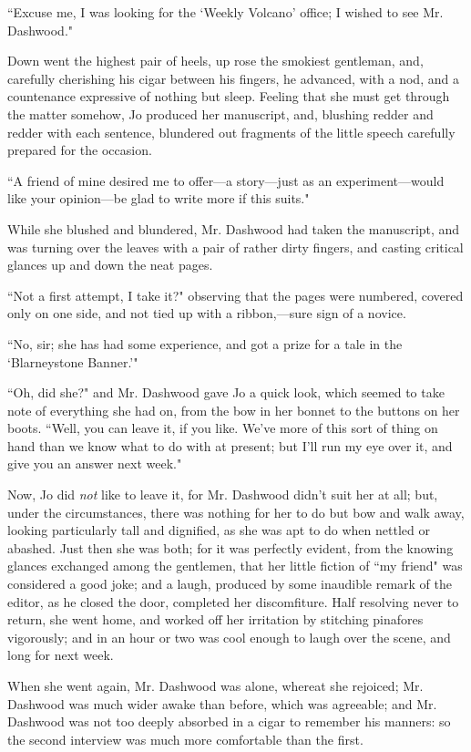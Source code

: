 ``Excuse me, I was looking for the `Weekly
Volcano' office; I wished to see Mr. Dashwood."

Down went the highest pair of heels, up rose the smokiest gentleman,
and, carefully cherishing his cigar between his fingers, he advanced,
with a nod, and a countenance expressive of nothing but sleep. Feeling
that she must get through the matter somehow, Jo produced her
manuscript, and, blushing redder and redder with each sentence,
blundered out fragments of the little speech carefully prepared for the
occasion.

``A friend of mine desired me to offer---a story---just as an
experiment---would like your opinion---be glad to write more if this
suits."

While she blushed and blundered, Mr. Dashwood had taken the manuscript,
and was turning over the leaves with a pair of rather dirty fingers, and
casting critical glances up and down the neat pages.

``Not a first attempt, I take it?" observing that the pages were
numbered, covered only on one side, and not tied up with a
ribbon,---sure sign of a novice.

``No, sir; she has had some experience, and got a prize for a tale in the
`Blarneystone Banner.'"

``Oh, did she?" and Mr. Dashwood gave Jo a quick look, which seemed to
take note of everything she had on, from the bow in her bonnet to the
buttons on her boots. ``Well, you can leave it, if you like.
We've more of this sort of thing on hand than we know
what to do with at present; but I'll run my eye over it,
and give you an answer next week."

Now, Jo did \emph{not} like to leave it, for Mr. Dashwood
didn't suit her at all; but, under the circumstances,
there was nothing for her to do but bow and walk away, looking
particularly tall and dignified, as she was apt to do when nettled or
abashed. Just then she was both; for it was perfectly evident, from the
knowing glances exchanged among the gentlemen, that her little fiction
of ``my friend" was considered a good joke; and a laugh, produced by some
inaudible remark of the editor, as he closed the door, completed her
discomfiture. Half resolving never to return, she went home, and worked
off her irritation by stitching pinafores vigorously; and in an hour or
two was cool enough to laugh over the scene, and long for next week.

When she went again, Mr. Dashwood was alone, whereat she rejoiced; Mr.
Dashwood was much wider awake than before, which was agreeable; and Mr.
Dashwood was not too deeply absorbed in a cigar to remember his manners:
so the second interview was much more comfortable than the first.

